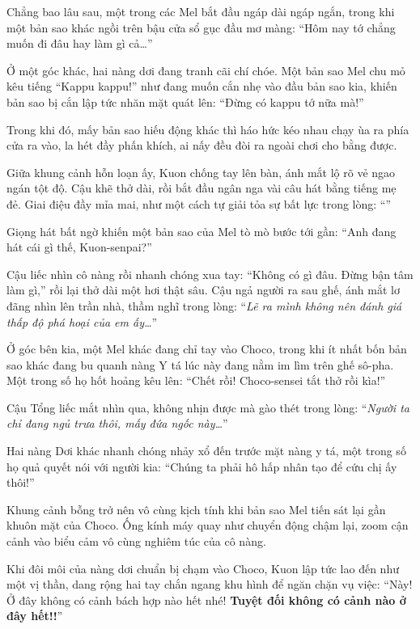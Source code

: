 \documentclass[../main.tex]{subfiles}
\begin{document}
Chẳng bao lâu sau, một trong các Mel bắt đầu ngáp dài ngáp ngắn, trong khi một bản sao khác ngồi trên bậu cửa sổ gục đầu mơ màng: ``Hôm nay tớ chẳng muốn đi đâu hay làm gì cả\dots''

Ở một góc khác, hai nàng dơi đang tranh cãi chí chóe. Một bản sao Mel chu mỏ kêu tiếng ``Kappu kappu!'' như đang muốn cắn nhẹ vào đầu bản sao kia, khiến bản sao bị cắn lập tức nhăn mặt quát lên: ``Đừng có kappu tớ nữa mà!''

Trong khi đó, mấy bản sao hiếu động khác thì háo hức kéo nhau chạy ùa ra phía cửa ra vào, la hét đầy phấn khích, ai nấy đều đòi ra ngoài chơi cho bằng được.

Giữa khung cảnh hỗn loạn ấy, Kuon chống tay lên bàn, ánh mắt lộ rõ vẻ ngao ngán tột độ. Cậu khẽ thở dài, rồi bắt đầu ngân nga vài câu hát bằng tiếng mẹ đẻ. Giai điệu đầy mỉa mai, như một cách tự giải tỏa sự bất lực trong lòng: ``''

Giọng hát bất ngờ khiến một bản sao của Mel tò mò bước tới gần: ``Anh đang hát cái gì thế, Kuon-senpai?''

Cậu liếc nhìn cô nàng rồi nhanh chóng xua tay: ``Không có gì đâu. Đừng bận tâm làm gì,'' rồi lại thở dài một hơi thật sâu. Cậu ngả người ra sau ghế, ánh mắt lơ đãng nhìn lên trần nhà, thầm nghĩ trong lòng: ``\textit{Lẽ ra mình không nên đánh giá thấp độ phá hoại của em ấy\dots}''


Ở góc bên kia, một Mel khác đang chỉ tay vào Choco, trong khi ít nhất bốn bản sao khác đang bu quanh nàng Y tá lúc này đang nằm im lìm trên ghế sô-pha. Một trong số họ hốt hoảng kêu lên: ``Chết rồi! Choco-sensei tắt thở rồi kìa!''

Cậu Tổng liếc mắt nhìn qua, không nhịn được mà gào thét trong lòng: ``\textit{Người ta chỉ đang ngủ trưa thôi, mấy đứa ngốc này\dots}''

Hai nàng Dơi khác nhanh chóng nhảy xổ đến trước mặt nàng y tá, một trong số họ quả quyết nói với người kia: ``Chúng ta phải hô hấp nhân tạo để cứu chị ấy thôi!''

Khung cảnh bỗng trở nên vô cùng kịch tính khi bản sao Mel tiến sát lại gần khuôn mặt của Choco. Ống kính máy quay như chuyển động chậm lại, zoom cận cảnh vào biểu cảm vô cùng nghiêm túc của cô nàng.


Khi đôi môi của nàng dơi chuẩn bị chạm vào Choco, Kuon lập tức lao đến như một vị thần, dang rộng hai tay chắn ngang khu hình để ngăn chặn vụ việc: ``Này! Ở đây không có cảnh bách hợp nào hết nhé! \textbf{Tuyệt đối không có cảnh nào ở đây hết!!}''
\end{document}
